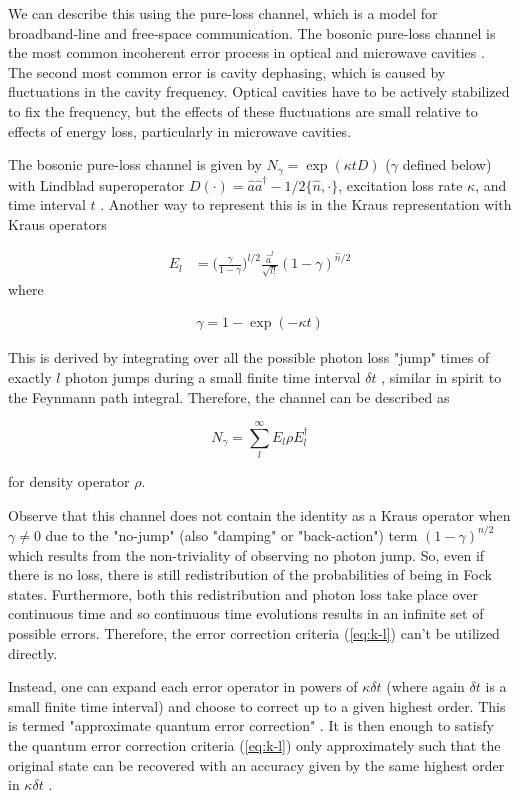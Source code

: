 \documentclass[12]{amsart}
\newcommand\0{\mathbf{0}}
\newcommand\<{\langle}
\renewcommand\>{\rangle}
\begin{document}
We can describe this using the pure-loss channel, which is a model for broadband-line and free-space communication. The bosonic pure-loss channel is the most common incoherent error process in optical and microwave cavities \cite{albert2017performance}. The second most common error is cavity dephasing, which is caused by fluctuations in the cavity frequency. Optical cavities have to be actively stabilized to fix the frequency, but the effects of these fluctuations are small relative to effects of energy loss, particularly in microwave cavities. 

The bosonic pure-loss channel is given by $N_\gamma = \exp(\kappa t D)$ ($\gamma$ defined below) with Lindblad superoperator $D(\cdot) = \hat{a} \hat{a}^\dag - 1/2 \{ \hat{n} , \cdot \}$, excitation loss rate $\kappa$,  and time interval $t$ \cite{albert2017performance}. Another way to represent this is in the Kraus representation with Kraus operators

\begin{align}
\label{eq:kraus}
E_l &= \Big(\frac{\gamma}{1-\gamma}\Big)^{l / 2} \frac{\hat{a}^l}{\sqrt{l!}}(1 - \gamma)^{\hat{n} / 2}
\end{align}
where

\begin{align}
\label{eq:gamma}
	\gamma = 1 - \exp(- \kappa t)
\end{align}

This is derived by integrating over all the possible photon loss "jump" times of exactly $l$ photon jumps during a small finite time interval $\delta t$ \cite{chuang1997bosonic}, similar in spirit to the Feynmann path integral. Therefore, the channel can be described as 

$$
N_\gamma = \sum_l^\infty E_l \rho E_l^\dag
$$

for density operator $\rho$.

Observe that this channel does not contain the identity as a Kraus operator when $\gamma \neq 0$ due to the "no-jump" (also "damping" or "back-action") term $(1-\gamma)^{n / 2}$ which results from the non-triviality of observing no photon jump. So, even if there is no loss, there is still redistribution of the probabilities of being in Fock states. Furthermore, both this redistribution and photon loss take place over continuous time and so continuous time evolutions results in an infinite set of possible errors. Therefore, the error correction criteria (\ref{eq:k-l}) can't be utilized directly. 

Instead, one can expand each error operator in powers of $\kappa \delta t$ (where again $\delta t$ is a small finite time interval) and choose to correct up to a given highest order. This is termed "approximate quantum error correction" \cite{mandayam2012towards}. It is then enough to satisfy the quantum error correction criteria (\ref{eq:k-l}) only approximately such that the original state can be recovered with an accuracy given by the same highest order in $\kappa \delta t$ \cite{michael2016new}.
\end{document}

